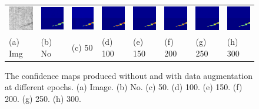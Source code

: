\documentclass[sn-mathphys]{sn-jnl}%
\theoremstyle{thmstyleone}%
\theoremstyle{thmstyletwo}%
\theoremstyle{thmstylethree}%
\begin{document}
\begin{figure}
{\begin{tabular}{p{1.2cm}p{1.2cm}p{1.2cm}p{1.2cm}p{1.2cm}p{1.2cm}p{1.2cm}p{1.2cm}}
    \includegraphics[width=0.6in]{fig7-4.png}&
    \includegraphics[width=0.6in]{fig7-4-0.png}&
    \includegraphics[width=0.6in]{fig7-4-50.png}&
    \includegraphics[width=0.6in]{fig7-4-100.png}&
    \includegraphics[width=0.6in]{fig7-4-150.png}&
    \includegraphics[width=0.6in]{fig7-4-200.png}&
    \includegraphics[width=0.6in]{fig7-4-250.png}&
    \includegraphics[width=0.6in]{fig7-4-300.png}\\

\centering\rmfamily(a) Img& \centering\rmfamily(b) No& \centering\rmfamily(c) 50& \centering\rmfamily(d) 100& \centering\rmfamily(e) 150& \centering\rmfamily(f) 200& \centering\rmfamily(g) 250& \centering\rmfamily(h) 300\\
\end{tabular}}
	\centering
	\caption{The confidence maps produced without and with data augmentation at different epochs. (a) Image. (b) No. (c) 50. (d) 100. (e) 150. (f) 200. (g) 250. (h) 300. }
	\label{fig:4.2.pix}
\end{figure}
\end{document}
